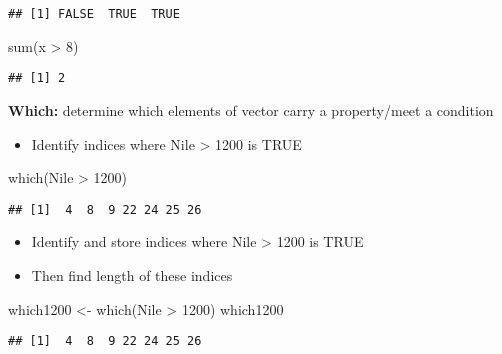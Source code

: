 \documentclass[
]{article}
\newenvironment{Shaded}{\begin{snugshade}}{\end{snugshade}}
\newcommand{\DecValTok}[1]{\textcolor[rgb]{0.00,0.00,0.81}{#1}}
\newcommand{\FunctionTok}[1]{\textcolor[rgb]{0.00,0.00,0.00}{#1}}
\newcommand{\NormalTok}[1]{#1}
\newcommand{\OtherTok}[1]{\textcolor[rgb]{0.56,0.35,0.01}{#1}}
\newcommand{\SpecialCharTok}[1]{\textcolor[rgb]{0.00,0.00,0.00}{#1}}
\providecommand{\tightlist}{%
  \setlength{\itemsep}{0pt}\setlength{\parskip}{0pt}}
\begin{document}
\begin{verbatim}
## [1] FALSE  TRUE  TRUE
\end{verbatim}

\begin{Shaded}
\begin{Highlighting}[]
\FunctionTok{sum}\NormalTok{(x }\SpecialCharTok{\textgreater{}} \DecValTok{8}\NormalTok{)}
\end{Highlighting}
\end{Shaded}

\begin{verbatim}
## [1] 2
\end{verbatim}

\textbf{Which:} determine which elements of vector carry a property/meet
a condition

\begin{itemize}
\tightlist
\item
  Identify indices where Nile \textgreater{} 1200 is TRUE
\end{itemize}

\begin{Shaded}
\begin{Highlighting}[]
\FunctionTok{which}\NormalTok{(Nile }\SpecialCharTok{\textgreater{}} \DecValTok{1200}\NormalTok{)}
\end{Highlighting}
\end{Shaded}

\begin{verbatim}
## [1]  4  8  9 22 24 25 26
\end{verbatim}

\begin{itemize}
\item
  Identify and store indices where Nile \textgreater{} 1200 is TRUE
\item
  Then find length of these indices
\end{itemize}

\begin{Shaded}
\begin{Highlighting}[]
\NormalTok{which1200 }\OtherTok{\textless{}{-}} \FunctionTok{which}\NormalTok{(Nile }\SpecialCharTok{\textgreater{}} \DecValTok{1200}\NormalTok{)}
\NormalTok{which1200}
\end{Highlighting}
\end{Shaded}

\begin{verbatim}
## [1]  4  8  9 22 24 25 26
\end{verbatim}
\end{document}
